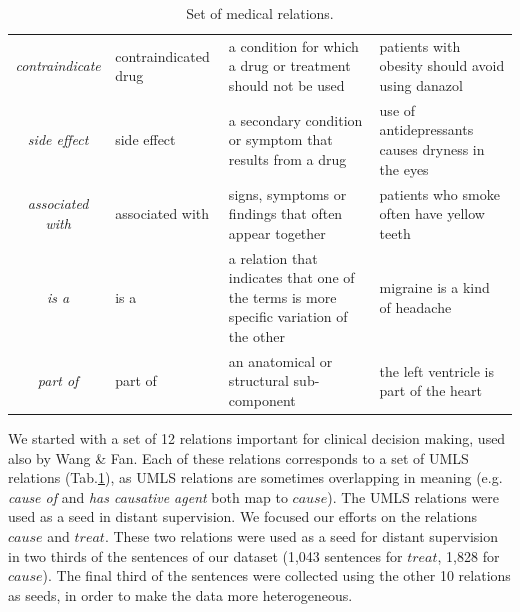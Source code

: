 \begin{table}[hbt!]
\begin{center}
{\begin{tabular}{cp{3.25cm}p{4.25cm}p{3.75cm}}
\cellcolor{aliceblue}\textit{contraindicate} & \cellcolor{aliceblue}contraindicated drug & \cellcolor{aliceblue}a condition for which a drug or treatment should not be used &  \cellcolor{aliceblue}patients with obesity should avoid using danazol \\  %

\textit{side effect} & side effect & a secondary condition or symptom that results from a drug %
&  use of antidepressants causes dryness in the eyes \\  %

\cellcolor{aliceblue}\textit{associated with} & \cellcolor{aliceblue}associated with & \cellcolor{aliceblue}signs, symptoms or findings that often appear together &  \cellcolor{aliceblue}patients who smoke often have yellow teeth \\  %

\textit{is a} & is a & a relation that indicates that one of the terms is more specific variation of the other &  migraine is a kind of headache \\  %

\cellcolor{aliceblue}\textit{part of} & \cellcolor{aliceblue}part of & \cellcolor{aliceblue}an anatomical or structural sub-component &  \cellcolor{aliceblue}the left ventricle is part of the heart \\  %
\bottomrule
\end{tabular}
}
\caption{Set of medical relations.}
\label{tab:relation_list}
\end{center}
\end{table}

We started with a set of 12 relations important for clinical decision making, used also by Wang \& Fan. Each of these relations corresponds to a set of UMLS relations (Tab.\ref{tab:relation_list}), as UMLS relations are sometimes overlapping in meaning (e.g. \textit{cause of} and \textit{has causative agent} both map to $cause$). The UMLS relations were used as a seed in distant supervision. We focused our efforts on the relations $cause$ and $treat$. These two relations were used as a seed for distant supervision in two thirds of the sentences of our dataset (1,043 sentences for $treat$, 1,828 for $cause$). The final third of the sentences were collected using the other 10 relations as seeds, in order to make the data more heterogeneous.


